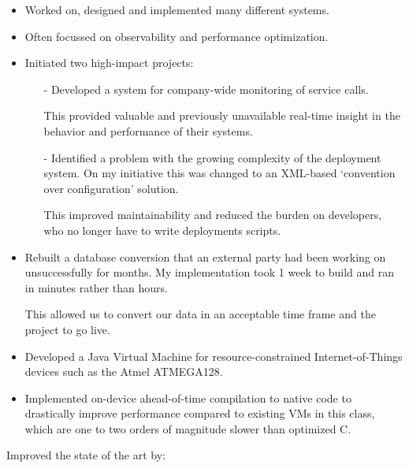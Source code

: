 \documentclass[10pt,a4paper]{../altacv}
\begin{document}
\begin{itemize}
	\item Worked on, designed and implemented many different systems.
	\smallskip
	\item Often focussed on observability and performance optimization.
	\smallskip
	\item Initiated two high-impact projects:
	\begin{itemize}
		\item[-] Developed a system for company-wide monitoring of service calls.
		
		This provided valuable and previously unavailable real-time insight in the behavior and performance of their systems.
		\smallskip
		\item[-] Identified a problem with the growing complexity of the deployment system. On my initiative this was changed to an XML-based ‘convention over configuration' solution.
		
		This improved maintainability and reduced the burden on developers, who no longer have to write deployments scripts.
	\end{itemize}
	\smallskip
	\item Rebuilt a database conversion that an external party had been working on unsuccessfully for months. My implementation took 1 week to build and ran in minutes rather than hours.
	
	This allowed us to convert our data in an acceptable time frame and the project to go live.
\end{itemize}

\medskip


\medskip\medskip{}

\begin{itemize}
	\item Developed a Java Virtual Machine for resource-constrained Internet-of-Things devices such as the Atmel ATMEGA128.
	\smallskip
	\item Implemented on-device ahead-of-time compilation to native code to drastically improve performance compared to existing VMs in this class, which are one to two orders of magnitude slower than optimized C.
\end{itemize}

Improved the state of the art by:
\end{document}
